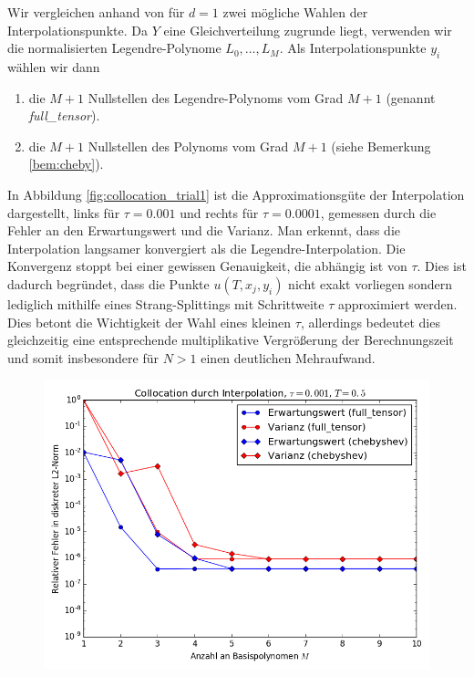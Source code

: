 \begin{mathbsp}
Wir vergleichen anhand von  für $d=1$ zwei mögliche Wahlen der Interpolationspunkte. Da $Y$ eine Gleichverteilung zugrunde liegt, verwenden wir die normalisierten Legendre-Polynome $L_0,\dots,L_M$. Als Interpolationspunkte $y_i$ wählen wir dann
\begin{enumerate}
\item die $M+1$ Nullstellen des Legendre-Polynoms vom Grad $M+1$ (genannt \textit{full\_tensor}).
\item die $M+1$ Nullstellen des \chebyspace Polynoms vom Grad $M+1$ (siehe Bemerkung \ref{bem:cheby}).
\end{enumerate}
In Abbildung \ref{fig:collocation_trial1} ist die Approximationsgüte der Interpolation dargestellt, links für $\tau=0.001$ und rechts für $\tau=0.0001$, gemessen durch die Fehler an den Erwartungswert und die Varianz. Man erkennt, dass die \chebyspace Interpolation langsamer konvergiert als die Legendre-Interpolation. Die Konvergenz stoppt bei einer gewissen Genauigkeit, die abhängig ist von $\tau$. Dies ist dadurch begründet, dass die Punkte $u(T,x_j,y_i)$ nicht exakt vorliegen sondern lediglich mithilfe eines Strang-Splittings mit Schrittweite $\tau$ approximiert werden. Dies betont die Wichtigkeit der Wahl eines kleinen $\tau$, allerdings bedeutet dies gleichzeitig eine entsprechende multiplikative Vergrößerung der Berechnungszeit und somit insbesondere für $N>1$ einen deutlichen Mehraufwand.
\begin{figure}[!htb]
  \includegraphics[width=\linewidth]{Figures/collocation_mi_trial1_tau001.png}

\end{figure}
\end{mathbsp}
